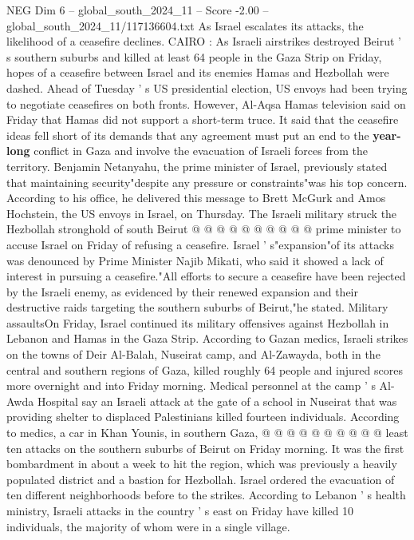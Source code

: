 \begin{textsample}{NEG Dim 6 – global\_south\_2024\_11 – Score -2.00 – global\_south\_2024\_11/117136604.txt}  \label{ex:f6_neg_063}
As Israel escalates its attacks, the likelihood of a ceasefire declines.
CAIRO : As Israeli airstrikes destroyed Beirut ' s southern suburbs and killed at least 64 people in the Gaza Strip on Friday, hopes of a ceasefire between Israel and its enemies Hamas and Hezbollah were dashed.
Ahead of Tuesday ' s US presidential election, US envoys had been trying to negotiate ceasefires on both fronts.
However, Al-Aqsa Hamas television said on Friday that Hamas did not support a short-term truce.
It said that the ceasefire ideas fell short of its demands that any agreement must put an end to the \textbf{year-long} conflict in Gaza and involve the evacuation of Israeli forces from the territory.
Benjamin Netanyahu, the prime minister of Israel, previously stated that maintaining security"despite any pressure or constraints"was his top concern.
According to his office, he delivered this message to Brett McGurk and Amos Hochstein, the US envoys in Israel, on Thursday.
The Israeli military struck the Hezbollah stronghold of south Beirut @ @ @ @ @ @ @ @ @ @ prime minister to accuse Israel on Friday of refusing a ceasefire.
Israel ' s"expansion"of its attacks was denounced by Prime Minister Najib Mikati, who said it showed a lack of interest in pursuing a ceasefire."All efforts to secure a ceasefire have been rejected by the Israeli enemy, as evidenced by their renewed expansion and their destructive raids targeting the southern suburbs of Beirut,"he stated.
Military assaultsOn Friday, Israel continued its military offensives against Hezbollah in Lebanon and Hamas in the Gaza Strip.
According to Gazan medics, Israeli strikes on the towns of Deir Al-Balah, Nuseirat camp, and Al-Zawayda, both in the central and southern regions of Gaza, killed roughly 64 people and injured scores more overnight and into Friday morning.
Medical personnel at the camp ' s Al-Awda Hospital say an Israeli attack at the gate of a school in Nuseirat that was providing shelter to displaced Palestinians killed fourteen individuals.
According to medics, a car in Khan Younis, in southern Gaza, @ @ @ @ @ @ @ @ @ @ least ten attacks on the southern suburbs of Beirut on Friday morning.
It was the first bombardment in about a week to hit the region, which was previously a heavily populated district and a bastion for Hezbollah.
Israel ordered the evacuation of ten different neighborhoods before to the strikes.
According to Lebanon ' s health ministry, Israeli attacks in the country ' s east on Friday have killed 10 individuals, the majority of whom were in a single village.

\end{textsample}
